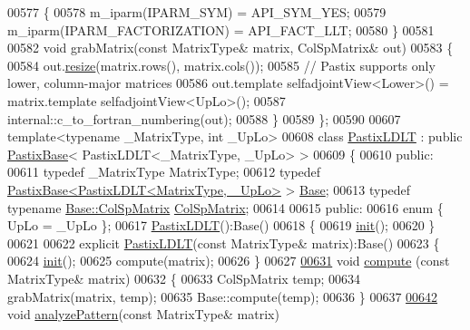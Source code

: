 \begin{DoxyCode}
00577     \{
00578       m\_iparm(IPARM\_SYM) = API\_SYM\_YES;
00579       m\_iparm(IPARM\_FACTORIZATION) = API\_FACT\_LLT;
00580     \}
00581     
00582     \textcolor{keywordtype}{void} grabMatrix(\textcolor{keyword}{const} MatrixType& matrix, ColSpMatrix& out)
00583     \{
00584       out.\hyperlink{group___sparse_core___module_af88551f30202341b7cc24cfadabdec5c}{resize}(matrix.rows(), matrix.cols());
00585       \textcolor{comment}{// Pastix supports only lower, column-major matrices }
00586       out.template selfadjointView<Lower>() = matrix.template selfadjointView<UpLo>();
00587       internal::c\_to\_fortran\_numbering(out);
00588     \}
00589 \};
00590 
00607 \textcolor{keyword}{template}<\textcolor{keyword}{typename} \_MatrixType, \textcolor{keywordtype}{int} \_UpLo>
00608 \textcolor{keyword}{class }\hyperlink{class_eigen_1_1_pastix_l_d_l_t}{PastixLDLT} : \textcolor{keyword}{public} \hyperlink{class_eigen_1_1_pastix_base}{PastixBase}< PastixLDLT<\_MatrixType, \_UpLo> >
00609 \{
00610   \textcolor{keyword}{public}:
00611     \textcolor{keyword}{typedef} \_MatrixType MatrixType;
00612     \textcolor{keyword}{typedef} \hyperlink{class_eigen_1_1_pastix_base}{PastixBase<PastixLDLT<MatrixType, \_UpLo>} > 
      \hyperlink{class_eigen_1_1_pastix_base}{Base}; 
00613     \textcolor{keyword}{typedef} \textcolor{keyword}{typename} \hyperlink{group___sparse_core___module}{Base::ColSpMatrix} \hyperlink{group___sparse_core___module}{ColSpMatrix};
00614     
00615   \textcolor{keyword}{public}:
00616     \textcolor{keyword}{enum} \{ UpLo = \_UpLo \};
00617     \hyperlink{class_eigen_1_1_pastix_l_d_l_t}{PastixLDLT}():Base()
00618     \{
00619       \hyperlink{structinit}{init}();
00620     \}
00621     
00622     \textcolor{keyword}{explicit} \hyperlink{class_eigen_1_1_pastix_l_d_l_t}{PastixLDLT}(\textcolor{keyword}{const} MatrixType& matrix):Base()
00623     \{
00624       \hyperlink{structinit}{init}();
00625       compute(matrix);
00626     \}
00627 
\hyperlink{class_eigen_1_1_pastix_l_d_l_t_abf3135c2dc17d9df26fef80e6456a691}{00631}     \textcolor{keywordtype}{void} \hyperlink{class_eigen_1_1_pastix_l_d_l_t_abf3135c2dc17d9df26fef80e6456a691}{compute} (\textcolor{keyword}{const} MatrixType& matrix)
00632     \{
00633       ColSpMatrix temp;
00634       grabMatrix(matrix, temp);
00635       Base::compute(temp);
00636     \}
00637 
\hyperlink{class_eigen_1_1_pastix_l_d_l_t_a01947862303ca404b9ce5033751a221b}{00642}     \textcolor{keywordtype}{void} \hyperlink{class_eigen_1_1_pastix_l_d_l_t_a01947862303ca404b9ce5033751a221b}{analyzePattern}(\textcolor{keyword}{const} MatrixType& matrix)

\end{DoxyCode}
